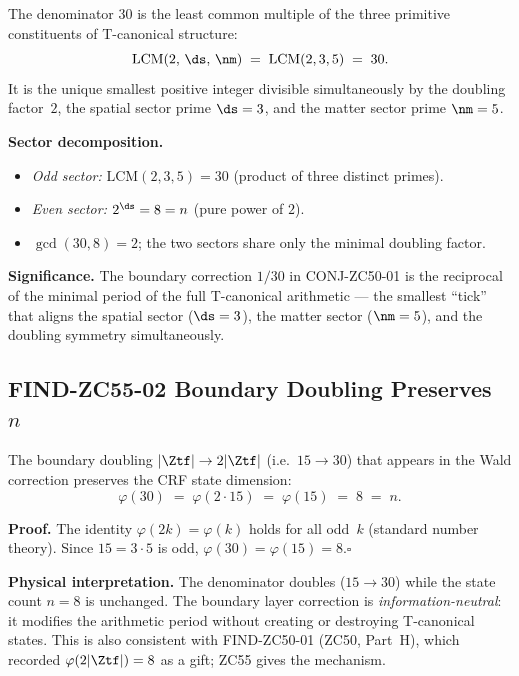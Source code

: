 \documentclass[12pt, a4paper]{article}
\begin{document}
\begin{derivedbox}[title={FIND-ZC55-01: $30=\mathrm{LCM}(2,\ds,\nm)$
  --- Minimal T-canonical Period ($R_0$, Exact)}]
The denominator $30$ is the least common multiple of the three
primitive constituents of T-canonical structure:
\begin{equation}
  \mathrm{LCM}(2,\,\ds,\,\nm) \;=\; \mathrm{LCM}(2,3,5) \;=\; 30.
  \label{eq:lcm-30}
\end{equation}
It is the unique smallest positive integer divisible simultaneously
by the doubling factor~$2$, the spatial sector prime $\ds=3$,
and the matter sector prime $\nm=5$.

\medskip
\textbf{Sector decomposition.}
\begin{itemize}[leftmargin=2em, noitemsep]
\item \emph{Odd sector:} $\mathrm{LCM}(2,3,5)=30$
  (product of three distinct primes).
\item \emph{Even sector:} $2^{\ds}=8=n$
  (pure power of $2$).
\item $\gcd(30,8)=2$; the two sectors share only the
  minimal doubling factor.
\end{itemize}

\medskip
\textbf{Significance.}  The boundary correction $1/30$ in
CONJ-ZC50-01 is the reciprocal of the minimal period of the full
T-canonical arithmetic --- the smallest ``tick'' that aligns the
spatial sector ($\ds=3$), the matter sector ($\nm=5$), and the
doubling symmetry simultaneously.
\end{derivedbox}

\subsection{FIND-ZC55-02 \quad Boundary Doubling Preserves $n$}


\begin{derivedbox}[title={FIND-ZC55-02:
  $\varphi(2|\Ztf|)=\varphi(|\Ztf|)=n$
  --- Boundary Preservation ($R_0$, Exact)}]
The boundary doubling $|\Ztf|\to2|\Ztf|$ (i.e.\ $15\to30$) that
appears in the Wald correction preserves the CRF state dimension:
\begin{equation}
  \varphi(30) \;=\; \varphi(2\cdot15) \;=\; \varphi(15) \;=\; 8 \;=\; n.
  \label{eq:phi-preserve}
\end{equation}

\textbf{Proof.}
The identity $\varphi(2k)=\varphi(k)$ holds for all odd~$k$
(standard number theory).  Since $15=3\cdot5$ is odd,
$\varphi(30)=\varphi(15)=8$.\hfill$\square$

\medskip
\textbf{Physical interpretation.}
The denominator doubles ($15\to30$) while the state count $n=8$
is unchanged.  The boundary layer correction is
\emph{information-neutral}: it modifies the arithmetic period
without creating or destroying T-canonical states.
This is also consistent with FIND-ZC50-01 (ZC50, Part~H), which
recorded $\varphi(2|\Ztf|)=8$ as a gift; ZC55 gives the mechanism.
\end{derivedbox}
\end{document}
